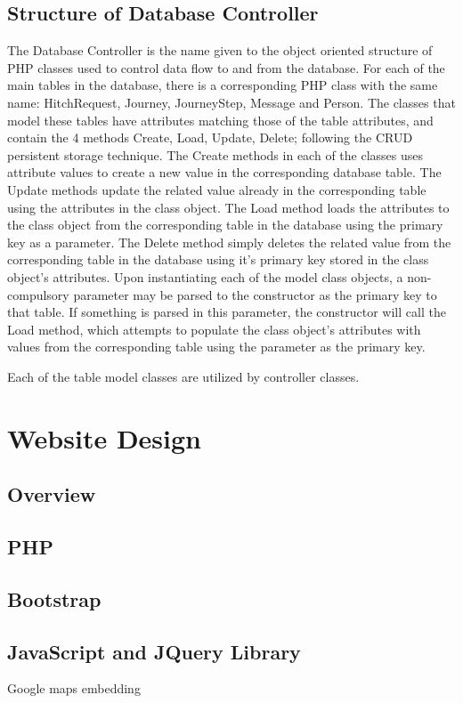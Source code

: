 	\subsection{Structure of Database Controller}
		The Database Controller is the name given to the object oriented structure of PHP classes used to control data flow to and from the database. For each of the main tables in the database, there is a corresponding PHP class with the same name: Hitch\textunderscore Request, Journey, Journey\textunderscore Step, Message and Person. The classes that model these tables have attributes matching those of the table attributes, and contain the 4 methods Create, Load, Update, Delete; following the CRUD persistent storage technique. The Create methods in each of the classes uses attribute values to create a new value in the corresponding database table. The Update methods update the related value already in the corresponding table using the attributes in the class object. The Load method loads the attributes to the class object from the corresponding table in the database using the primary key as a parameter. The Delete method simply deletes the related value from the corresponding table in the database using it's primary key stored in the class object's attributes. Upon instantiating each of the model class objects, a non-compulsory parameter may be parsed to the constructor as the primary key to that table. If something is parsed in this parameter, the constructor will call the Load method, which attempts to populate the class object's attributes with values from the corresponding table using the parameter as the primary key.
		
		Each of the table model classes are utilized by controller classes.
		
		
\section{Website Design}
	\subsection{Overview}
	\subsection{PHP}
	\subsection{Bootstrap}
	\subsection{JavaScript and JQuery Library}
	Google maps embedding

